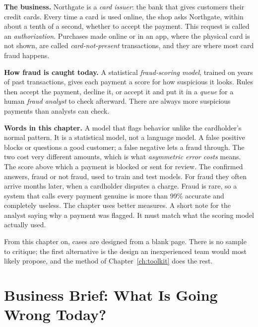 \begin{beforeyoustart}
\textbf{The business.} Northgate is a \emph{card issuer}: the bank that gives customers their credit cards. Every time a card is used online, the shop asks Northgate, within about a tenth of a second, whether to accept the payment. This request is called an \emph{authorization}. Purchases made online or in an app, where the physical card is not shown, are called \emph{card-not-present} transactions, and they are where most card fraud happens.

\textbf{How fraud is caught today.} A statistical \emph{fraud-scoring model}, trained on years of past transactions, gives each payment a score for how suspicious it looks. Rules then accept the payment, decline it, or accept it and put it in a \emph{queue} for a human \emph{fraud analyst} to check afterward. There are always more suspicious payments than analysts can check.

\textbf{Words in this chapter.}
 A model that flags behavior unlike the cardholder's normal pattern. It is a statistical model, not a language model.
 A false positive blocks or questions a good customer; a false negative lets a fraud through. The two cost very different amounts, which is what \emph{asymmetric error costs} means.
 The score above which a payment is blocked or sent for review.
 The confirmed answers, fraud or not fraud, used to train and test models. For fraud they often arrive months later, when a cardholder disputes a charge.
 Fraud is rare, so a system that calls every payment genuine is more than 99\% accurate and completely useless. The chapter uses better measures.
 A short note for the analyst saying why a payment was flagged. It must match what the scoring model actually used.
\end{beforeyoustart}


From this chapter on, cases are designed from a blank page. There is no sample to critique; the first alternative is the design an inexperienced team would most likely propose, and the method of Chapter~\ref{ch:toolkit} does the rest.

\section{Business Brief: What Is Going Wrong Today?}
\label{sec:fr-brief}

